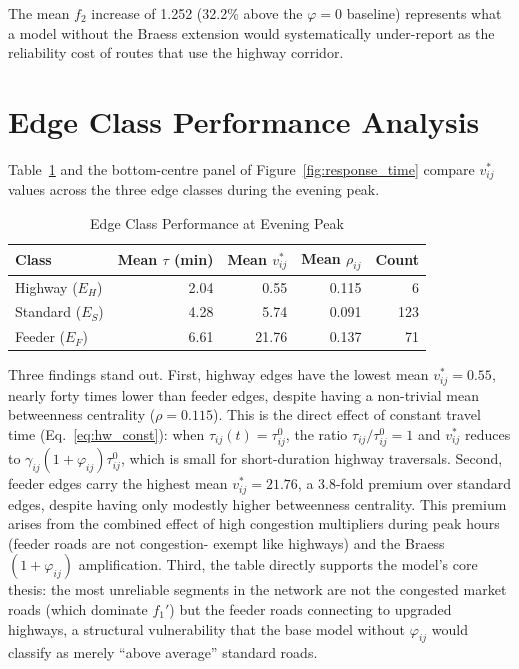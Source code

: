 \documentclass[paper=A4, 12pt, mathscr]{report}
\begin{document}
	The mean $f_2$ increase of 1.252 (32.2\% above the $\varphi=0$
	baseline) represents what a model without the Braess extension would
	systematically under-report as the reliability cost of routes that use
	the highway corridor.
	
	\section{Edge Class Performance Analysis}
	
	Table~\ref{tab:edgeperf} and the bottom-centre panel of
	Figure~\ref{fig:response_time} compare $v^*_{ij}$ values across the
	three edge classes during the evening peak.
	
	\begin{table}[H]
		\centering
		\caption{Edge Class Performance at Evening Peak}
		\label{tab:edgeperf}
		\begin{tabular}{lrrrr}
			\hline
			\textbf{Class} & \textbf{Mean $\tau$ (min)}
			& \textbf{Mean $v^*_{ij}$} & \textbf{Mean $\rho_{ij}$}
			& \textbf{Count} \\
			\hline
			Highway  ($E_H$) & 2.04 &  0.55 & 0.115 &   6 \\
			Standard ($E_S$) & 4.28 &  5.74 & 0.091 & 123 \\
			Feeder   ($E_F$) & 6.61 & 21.76 & 0.137 &  71 \\
			\hline
		\end{tabular}
	\end{table}
	
	Three findings stand out. First, highway edges have the lowest mean
	$v^*_{ij}=0.55$, nearly forty times lower than feeder edges, despite
	having a non-trivial mean betweenness centrality ($\rho=0.115$). This is
	the direct effect of constant travel time (Eq.~\eqref{eq:hw_const}):
	when $\tau_{ij}(t)=\tau_{ij}^0$, the ratio $\tau_{ij}/\tau_{ij}^0=1$
	and $v^*_{ij}$ reduces to $\gamma_{ij}(1+\varphi_{ij})\tau_{ij}^0$,
	which is small for short-duration highway traversals. Second, feeder
	edges carry the highest mean $v^*_{ij}=21.76$, a 3.8-fold premium over
	standard edges, despite having only modestly higher betweenness
	centrality. This premium arises from the combined effect of high
	congestion multipliers during peak hours (feeder roads are not congestion-
	exempt like highways) and the Braess $(1+\varphi_{ij})$ amplification.
	Third, the table directly supports the model's core thesis: the most
	unreliable segments in the network are not the congested market roads
	(which dominate $f_1'$) but the feeder roads connecting to upgraded
	highways, a structural vulnerability that the base model without
	$\varphi_{ij}$ would classify as merely ``above average'' standard roads.
	
\end{document}
